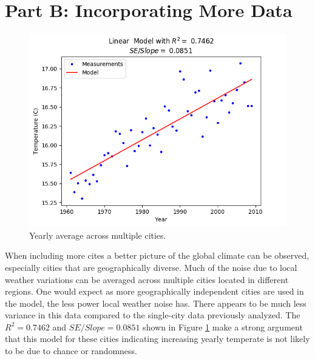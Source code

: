 \documentclass[letterpaper]{article}
\begin{document}
	\section*{Part B: Incorporating More Data}
	\begin{figure}[h]
		\includegraphics[scale=0.625]{Figure_3_B}
		\centering
		\caption{Yearly average across multiple cities.}
		\label{fig:Cities Avg}
	\end{figure}
	When including more cites a better picture of the global climate can be observed, especially cities that are geographically diverse.
	Much of the noise due to local weather variations can be averaged across multiple cities located in different regions.
	One would expect as more geographically independent cities are used in the model, the less power local weather noise has.
	There appears to be much less variance in this data compared to the single-city data previously analyzed.
	The $R^2 = 0.7462$ and $SE/Slope = 0.0851$ shown in Figure \ref{fig:Cities Avg} make a strong argument that this model for these cities indicating increasing yearly temperate is not likely to be due to chance or randomness.
\end{document}
